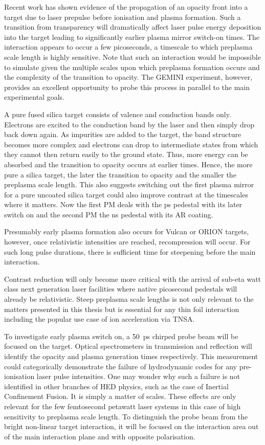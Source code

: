 Recent work has shown evidence of the propagation of an opacity front into a target due to laser prepulse before ionisation and plasma formation. Such a transition from transparency will dramatically affect laser pulse energy deposition into the target leading to significantly earlier plasma mirror switch-on times. The interaction appears to occur a few picoseconds, a timescale to which preplasma scale length is highly sensitive. Note that such an interaction would be impossible to simulate given the multiple scales upon which preplasma formation occurs and the complexity of the transition to opacity. The GEMINI experiment, however, provides an excellent opportunity to probe this process in parallel to the main experimental goals.

 A pure fused silica target consists of valence and conduction bands only. Electrons are excited to the conduction band by the laser and then simply drop back down again. As impurities are added to the target, the band structure becomes more complex and electrons can drop to intermediate states from which they cannot then return easily to the ground state. Thus, more energy can be absorbed and the transition to opacity occurs at earlier times. Hence, the more pure a silica target, the later the transition to opacity and the smaller the preplasma scale length. This also suggests switching out the first plasma mirror for a pure uncoated silica target could also improve contrast at the timescales where it matters. Now the first PM deals with the ps pedestal with its later switch on and the second PM the ns pedestal with its AR coating.

Presumably early plasma formation also occurs for Vulcan or ORION targets, however, once relativistic intensities are reached, recompression will occur. For such long pulse durations, there is sufficient time for steepening before the main interaction. 

Contrast reduction will only become more critical with the arrival of sub-eta watt class next generation laser facilities where native picosecond pedestals will already be relativistic. Steep preplasma scale lengths is not only relevant to the matters presented in this thesis but is essential for any thin foil interaction including the popular use case of ion acceleration via TNSA.

To investigate early plasma switch on, a \qty{50}{ps} chirped probe beam will be focused on the target. Optical spectrometers in transmission and reflection will identify the opacity and plasma generation times respectively. This measurement could categorically demonstrate the failure of hydrodynamic codes for any pre-ionisation laser pulse intensities. One may wonder why such a failure is not identified in other branches of HED physics, such as the case of Inertial Confinement Fusion. It is simply a matter of scales. These effects are only relevant for the few femtosecond petawatt laser systems in this case of high sensitivity to preplasma scale length.
To distinguish the probe beam from the bright non-linear target interaction, it will be focused on the interaction area out of the main interaction plane and with opposite polarisation.

